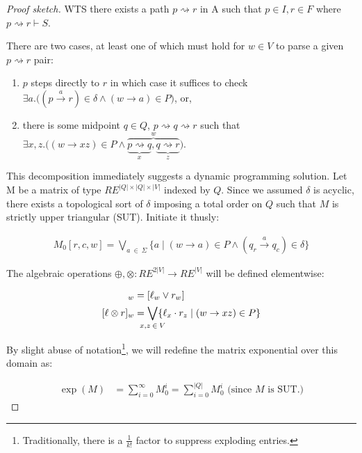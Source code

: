 \documentclass[sigplan,review,acmsmall,nonacm,screen,anonymous]{acmart}\settopmatter{printfolios=false,printccs=false,printacmref=false}
\begin{document}
  \begin{proof}[Proof sketch]
    WTS there exists a path $p \rightsquigarrow r$ in A such that $p\in I, r\in F$ where $p \rightsquigarrow r \vdash S$.\vspace{0.3cm}

    \noindent There are two cases, at least one of which must hold for $w \in V$ to parse a given $p \rightsquigarrow r$ pair:

    \begin{enumerate}
      \item $p$ steps directly to $r$ in which case it suffices to check $\exists a.\big((p \overset{a}{\rightarrow} r)\in \delta \land (w \rightarrow a) \in P\big)$, or,
      \item there is some midpoint $q \in Q$, $p \rightsquigarrow q \rightsquigarrow r$ such that $\exists x, z.\big((w \rightarrow xz) \in P\land\overbrace{\underbrace{p \rightsquigarrow q}_x, \underbrace{q \rightsquigarrow r}_z}^w\big)$.
    \end{enumerate}

    \noindent This decomposition immediately suggests a dynamic programming solution. Let M be a matrix of type $RE^{|Q|\times|Q|\times|V|}$  indexed by $Q$. Since we assumed $\delta$ is acyclic, there exists a topological sort of $\delta$ imposing a total order on $Q$ such that $M$ is strictly upper triangular (SUT). Initiate it thusly:

    \begin{align}
      M_0[r, c, w] = \bigvee_{a\:\in\:\Sigma} \{a \mid (w \rightarrow a) \in P \land (q_r \overset{a}{\rightarrow} q_c)\in \delta\}
    \end{align}

    \noindent The algebraic operations $\oplus, \otimes: RE^{2|V|} \rightarrow RE^{|V|}$ will be defined elementwise:

    \begin{align}
      [\ell \oplus r]_w  &= [\ell_w \lor r_w]\\
      [\ell \otimes r]_w &= \bigvee_{\mathclap{x, z\:\in\:V}}\{\ell_x \cdot r_z \mid (w \rightarrow xz) \in P\}
    \end{align}

    \noindent By slight abuse of notation\footnote{Traditionally, there is a $\frac{1}{k!}$ factor to suppress exploding entries.}, we will redefine the matrix exponential over this domain as:

    \begin{align}
      \exp(M) &= \sum_{i = 0}^\infty M_0^i = \sum_{i = 0}^{|Q|} M_0^i \text { (since $M$ is SUT.)}
    \end{align}


\end{proof}
\end{document}
